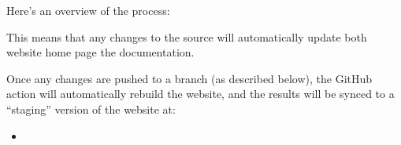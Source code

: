 \documentclass[letterpaper,10pt,english,openany,oneside]{sphinxmanual}
\begin{document}
\sphinxAtStartPar
Here’s an overview of the process:

\begin{sphinxVerbatim}[commandchars=\\\{\}]
                
\end{sphinxVerbatim}

\sphinxAtStartPar
This means that any changes to the source will automatically update both
website home page the documentation.

\sphinxAtStartPar
Once any changes are pushed to a branch (as described below), the GitHub
action will automatically rebuild the website, and the results will be
synced to a “staging” version of the website at:
\begin{itemize}
\item {} 
\sphinxAtStartPar
{}

\end{itemize}
\end{document}
